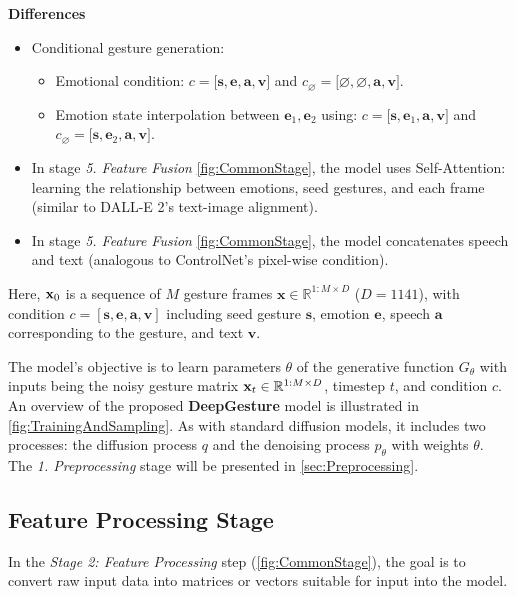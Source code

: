 \textbf{Differences}
\begin{itemize}
	\item Conditional gesture generation:
	\begin{itemize}
		\item Emotional condition: $c = \big[ \mathbf{s}, \mathbf{e}, \mathbf{a}, \mathbf{v} \big]$ and $c_{\varnothing} = \big[ \varnothing, \varnothing, \mathbf{a}, \mathbf{v}\big]$.
		\item Emotion state interpolation between $\mathbf{e}_1, \mathbf{e}_2$ using: $c = \big[ \mathbf{s}, \mathbf{e}_1, \mathbf{a}, \mathbf{v} \big]$ and $c_{\varnothing} = \big[ \mathbf{s}, \mathbf{e}_2, \mathbf{a}, \mathbf{v} \big]$.
	\end{itemize}
	\item In stage \textit{5. Feature Fusion} \autoref{fig:CommonStage}, the model uses Self-Attention: learning the relationship between emotions, seed gestures, and each frame (similar to DALL-E 2's text-image alignment).
	\item In stage \textit{5. Feature Fusion} \autoref{fig:CommonStage}, the model concatenates speech and text (analogous to ControlNet's pixel-wise condition).
\end{itemize}

Here, $\mathbf{x}_0$ is a sequence of $M$ gesture frames $\mathbf{x} \in \mathbb{R}^{1:M \times D}$ ($D = 1141$), with condition $c = [\mathbf{s}, \mathbf{e}, \mathbf{a}, \mathbf{v}]$ including seed gesture $\mathbf{s}$, emotion $\mathbf{e}$, speech $\mathbf{a}$ corresponding to the gesture, and text $\mathbf{v}$.

The model's objective is to learn parameters $\theta$ of the generative function $G_{\theta}$ with inputs being the noisy gesture matrix $\mathbf{x}_t \in \mathbb{R}^{1:M \times D}$, timestep $t$, and condition $c$. An overview of the proposed \textbf{DeepGesture} model is illustrated in \autoref{fig:TrainingAndSampling}. As with standard diffusion models, it includes two processes: the diffusion process $q$ and the denoising process $p_{\theta}$ with weights $\theta$. The \textit{1. Preprocessing} stage will be presented in \autoref{sec:Preprocessing}.


\subsection{Feature Processing Stage}

In the \textit{Stage 2: Feature Processing} step (\autoref{fig:CommonStage}), the goal is to convert raw input data into matrices or vectors suitable for input into the model.

